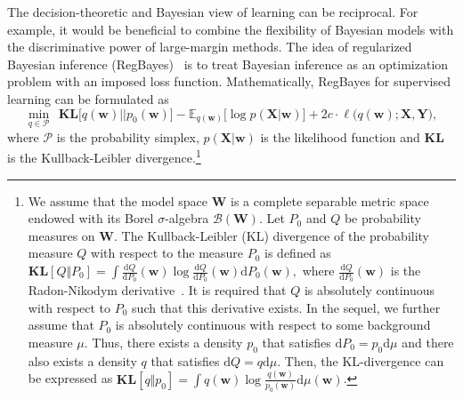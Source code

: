 \documentclass[twoside,11pt]{article}
\newcommand{\Xv}{\bm{X}}
\newcommand{\Yv}{\bm{Y}}
\newcommand{\wv}{\bm{w}}
\newcommand{\Wv}{\bm{W}}
\newcommand{\loss}{\ell}
\newcommand{\ud}{\mathrm{d}}
\newcommand{\ep}{\mathbb{E}}
\newcommand{\KL}{\textbf{KL}}
\begin{document}
The decision-theoretic and Bayesian view of learning can be reciprocal. For example, it would be beneficial to combine the flexibility of Bayesian models with the discriminative power of large-margin methods. The idea of regularized Bayesian inference (RegBayes)~\citep{zhu2013bayesian} is to treat Bayesian inference as an optimization problem with an imposed loss function. Mathematically, RegBayes for supervised learning can be formulated as
\begin{equation}\label{eq:regBayes}
\min\limits_{q \in \mathcal{P}}~~ \KL\Big[q(\wv)||p_0(\wv)\Big] - \ep_{q(\wv)} \Big[ \log p(\Xv | \wv) \Big] + 2c \cdot \loss\Big(q(\wv); \Xv, \Yv \Big),
\end{equation}
where $\mathcal{P}$ is the probability simplex, $p(\Xv | \wv)$ is the likelihood function and $\KL$ is the Kullback-Leibler divergence.\footnote{We assume that the model space $\Wv$ is a complete separable metric space endowed with its Borel $\sigma$-algebra $\mathcal{B}(\Wv)$. Let $P_0$ and $Q$ be probability measures on $\Wv$. The Kullback-Leibler (KL) divergence of the probability measure $Q$ with respect to the measure $P_0$ is defined as $\KL[ Q \Vert P_0] = \int \frac{\ud Q}{\ud P_0}(\wv) \log \frac{\ud Q}{\ud P_0}(\wv) \ud P_0(\wv),$ where $\frac{\ud Q}{\ud P_0}(\wv)$ is the Radon-Nikodym derivative~\citep{durret2010}. It is required that $Q$ is absolutely continuous with respect to $P_0$ such that this derivative exists. In the sequel, we further assume that $P_0$ is absolutely continuous with respect to some background measure $\mu$. Thus, there exists a density $p_0$ that satisfies $\ud P_0 = p_0 \ud \mu$ and there also exists a density $q$ that satisfies $\ud Q = q \ud \mu$. Then, the KL-divergence can be expressed as $\KL[ q \Vert p_0 ] = \int q(\wv) \log \frac{q(\wv)}{p_0(\wv)} \ud \mu(\wv)$.}
\end{document}
